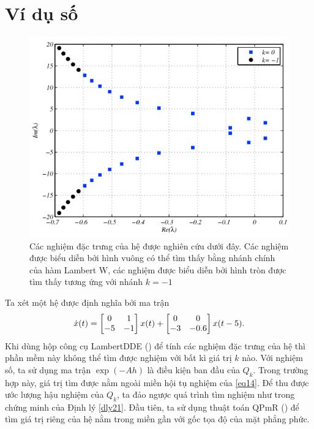 \section{Ví dụ số \label{sec5}}
\begin{figure}[h!]
	\centering
	\includegraphics[scale= 0.7]{"./Hinh/Hinh 2"}
	\caption[Các nghiệm đặc trưng của hệ được nghiên cứu dưới đây. Các nghiệm được biểu diễn bởi hình vuông có thể tìm thấy bằng nhánh chính của hàm Lambert W, các nghiệm được biểu diễn bởi hình tròn được tìm thấy tương ứng với nhánh $k = -1$ ] {Các nghiệm đặc trưng của hệ được nghiên cứu dưới đây. Các nghiệm được biểu diễn bởi hình vuông có thể tìm thấy bằng nhánh chính của hàm Lambert W, các nghiệm được biểu diễn bởi hình tròn được tìm thấy tương ứng với nhánh $k = -1$}
	\label{fig:hinh-2}
\end{figure}
%
\noindent Ta xét một hệ được định nghĩa bởi ma trận
\begin{equation}\label{eq33}
	\dot{x}(t) = \begin{bmatrix} 0 & 1\\ -5 &-1 \end{bmatrix}x(t) + \begin{bmatrix} 	0 & 0\\ -3 &-0.6 \end{bmatrix}x(t - 5).
\end{equation}
Khi dùng hộp công cụ LambertDDE (\cite{YiJune12}) để tính các nghiệm đặc trưng của hệ thì phần mềm này không thể tìm được nghiệm với bất kì giá trị $k$ nào. Với nghiệm số, ta sử dụng ma trận $\exp (-Ah )$ là điều kiện ban đầu của $Q_k$. Trong trường hợp này, giá trị tìm được nằm ngoài miền hội tụ nghiệm của \eqref{eq14}.
Để thu được ước lượng hậu nghiệm của $Q_k$, ta đảo ngược quá trình tìm nghiệm như trong chứng minh của Định lý \ref{dly21}. 
Đầu tiên, ta sử dụng thuật toán QPmR (\cite{Vyh09}) để tìm giá trị riêng của hệ nằm trong miền gần với gốc tọa độ của mặt phẳng phức. 
